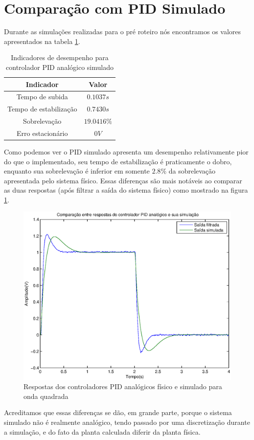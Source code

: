 \documentclass{article}
\begin{document}
\section{Comparação com PID Simulado}
Durante as simulações realizadas para o pré roteiro \cite{bb:prelab4} nós encontramos os valores apresentados na tabela \ref{tab:pidsim}.\\
\begin{table}[H]
	\centering
	\caption{Indicadores de desempenho para controlador PID analógico simulado}
	\label{tab:pidsim}
	\begin{tabular}{|c|c|}
		\hline Indicador & Valor \\ 
		\hline Tempo de subida & $0.1037s$\\ 
		\hline Tempo de estabilização & $0.7430s$\\ 
		\hline Sobrelevação & $19.0416\%$\\ 
		\hline Erro estacionário& $0V$\\ 
		\hline 
	\end{tabular} 
\end{table}
Como podemos ver o PID simulado apresenta um desempenho relativamente pior do que o implementado, seu tempo de estabilização é praticamente o dobro, enquanto sua sobrelevação é inferior em somente $2.8 \%$ da sobrelevação apresentada pelo sistema físico. Essas diferenças são mais notáveis ao comparar as duas respostas (após filtrar a saída do sistema físico) como mostrado na figura \ref{fig:yrsim}.
\begin{figure}[H]
	\centering
	\includegraphics[width=0.8\linewidth]{yrsim}
	\caption{Respostas dos controladores PID analógicos físico e simulado para onda quadrada}
	\label{fig:yrsim}
\end{figure}
Acreditamos que essas diferenças se dão, em grande parte, porque o sistema simulado não é realmente analógico, tendo passado por uma discretização durante a simulação, e do fato da planta calculada diferir da planta física.
\end{document}
